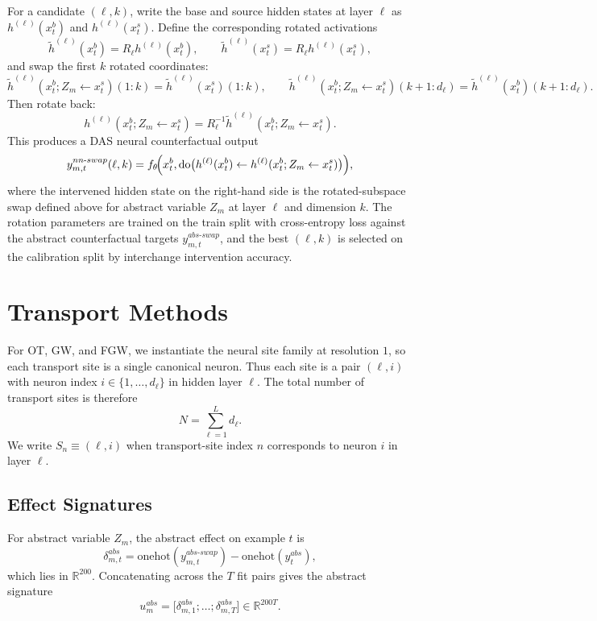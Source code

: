 \documentclass[11pt]{article}
\newcommand{\R}{\mathbb{R}}
\begin{document}
For a candidate $(\ell,k)$, write the base and source hidden states at layer $\ell$ as $h^{(\ell)}(x_t^b)$ and $h^{(\ell)}(x_t^s)$. Define the corresponding rotated activations
\[
\widetilde{h}^{(\ell)}(x_t^b) = R_\ell h^{(\ell)}(x_t^b),\qquad
\widetilde{h}^{(\ell)}(x_t^s) = R_\ell h^{(\ell)}(x_t^s),
\]
and swap the first $k$ rotated coordinates:
\[
\widetilde{h}^{(\ell)}(x_t^b; Z_m \leftarrow x_t^s)(1\!:\!k) = \widetilde{h}^{(\ell)}(x_t^s)(1\!:\!k),\qquad
\widetilde{h}^{(\ell)}(x_t^b; Z_m \leftarrow x_t^s)(k\!+\!1\!:\!d_\ell) = \widetilde{h}^{(\ell)}(x_t^b)(k\!+\!1\!:\!d_\ell).
\]
Then rotate back:
\[
h^{(\ell)}(x_t^b; Z_m \leftarrow x_t^s)
=
R_\ell^{-1}\widetilde{h}^{(\ell)}(x_t^b; Z_m \leftarrow x_t^s).
\]
This produces a DAS neural counterfactual output
\[
y_{m,t}^{nn\text{-}swap}(\ell,k)
=
f_\theta\!\Bigl(
x_t^b,
\mathrm{do}\bigl(
h^{(\ell)}(x_t^b)
\leftarrow
h^{(\ell)}(x_t^b; Z_m \leftarrow x_t^s)
\bigr)
\Bigr),
\]
where the intervened hidden state on the right-hand side is the rotated-subspace swap defined above for abstract variable $Z_m$ at layer $\ell$ and dimension $k$.
The rotation parameters are trained on the train split with cross-entropy loss against the abstract counterfactual targets $y_{m,t}^{abs\text{-}swap}$, and the best $(\ell,k)$ is selected on the calibration split by interchange intervention accuracy.

\section{Transport Methods}
For OT, GW, and FGW, we instantiate the neural site family at resolution $1$, so each transport site is a single canonical neuron. Thus each site is a pair $(\ell,i)$ with neuron index $i \in \{1,\dots,d_\ell\}$ in hidden layer $\ell$. The total number of transport sites is therefore
\[
N = \sum_{\ell=1}^{L} d_\ell.
\]
We write $S_n \equiv (\ell,i)$ when transport-site index $n$ corresponds to neuron $i$ in layer $\ell$.

\subsection{Effect Signatures}
For abstract variable $Z_m$, the abstract effect on example $t$ is
\[
\delta_{m,t}^{abs}
=
\mathrm{onehot}(y_{m,t}^{abs\text{-}swap}) - \mathrm{onehot}(y_t^{abs}),
\]
which lies in $\R^{200}$. Concatenating across the $T$ fit pairs gives the abstract signature
\[
u_m^{abs}
=
\bigl[\delta_{m,1}^{abs}; \dots; \delta_{m,T}^{abs}\bigr]
\in \R^{200T}.
\]
\end{document}

